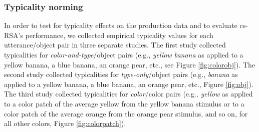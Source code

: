 \documentclass[11pt]{article}
\newcommand{\figref}[1]{Figure \ref{#1}}
\begin{document}
\subsubsection{Typicality norming}
\label{sec:typicalitynormingcolor}

In order to test for typicality effects on the production data and to evaluate cs-RSA's performance, we collected empirical typicality values for each utterance/object pair in three separate studies. The first study collected typicalities for \emph{color-and-type}/object pairs (e.g., \emph{yellow banana} as applied to a yellow banana, a blue banana, an orange pear, etc., see \figref{fig:colorobj}). The second study collected typicalities for \emph{type-only}/object pairs (e.g., \emph{banana} as applied to a yellow banana, a blue banana, an orange pear, etc., \figref{fig:obj}). The third study collected typicalities for \emph{color}/color pairs (e.g., \emph{yellow} as applied to a color patch of the average yellow from the yellow banana stimulus or to a color patch of the average orange from the orange pear stimulus, and so on, for all other colors, \figref{fig:colorpatch}). 
\end{document}
